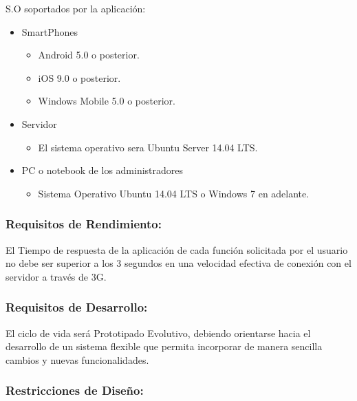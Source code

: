             
            S.O soportados por la aplicación:
            \begin{itemize}
                \item SmartPhones 
                \begin{itemize}
                    \item Android 5.0 o posterior.
                    \item iOS 9.0 o posterior.
                    \item Windows Mobile 5.0 o posterior. 
                \end{itemize}
                \item Servidor 
                \begin{itemize}
                    \item  El sistema operativo sera Ubuntu Server 14.04 LTS. 
                \end{itemize}
                \item PC o notebook de los administradores 
                \begin{itemize}
                    \item Sistema Operativo Ubuntu 14.04 LTS o Windows 7 en adelante. 
                \end{itemize} 
            \end{itemize}
            
        \subsubsection{Requisitos de Rendimiento:}
        
        El Tiempo de respuesta de la aplicación de cada función solicitada por el usuario no debe ser superior a los 3 segundos en una velocidad efectiva de conexión con el servidor a través de 3G.
        
        \subsubsection{Requisitos de Desarrollo:}
        
        El ciclo de vida será Prototipado Evolutivo, debiendo orientarse hacia el desarrollo de un sistema flexible que permita incorporar de manera sencilla cambios y nuevas funcionalidades.
        
       \subsubsection{Restricciones de Diseño:}
       
